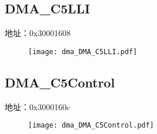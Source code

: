 \subsection{DMA\_C5LLI}
\label{dma-DMA-C5LLI}
地址：0x30001608
 \begin{figure}[H]
\texttt{[image: dma\_DMA\_C5LLI.pdf]}
\end{figure}

\subsection{DMA\_C5Control}
\label{dma-DMA-C5Control}
地址：0x3000160c
 \begin{figure}[H]
\texttt{[image: dma\_DMA\_C5Control.pdf]}
\end{figure}

